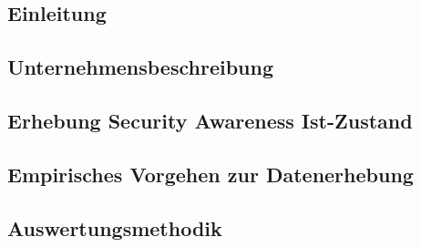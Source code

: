 \documentclass[../../main.tex]{subfiles}
\begin{document}
\subsection{Einleitung}


\subsection{Unternehmensbeschreibung}
\label{unternehmensbeschreibung}


\subsection{Erhebung Security Awareness Ist-Zustand}
\label{erhebung_der_anspruchsgruppen}


\subsection{Empirisches Vorgehen zur Datenerhebung}


\subsection{Auswertungsmethodik}
\label{Auswertungsmethodik}

\end{document}
